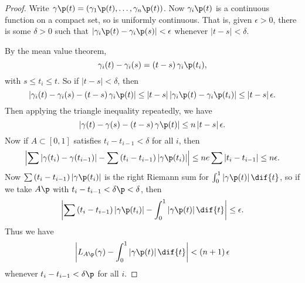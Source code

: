 \begin{proof}
	Write $\gamma\p(t) = (\gamma_1\p(t), \ldots, \gamma_n\p(t))$. Now $\gamma_i\p(t)$ is a continuous function on a compact set, so is uniformly continuous. That is, given $\epsilon>0$, there is some $\delta>0$ such that $\left\vert \gamma_i\p(t) - \gamma_i\p(s) \right\vert < \epsilon$ whenever $\left\vert t-s \right\vert<\delta$. %
	
	By the mean value theorem,
	\begin{equation*}
		\gamma_i(t) - \gamma_i(s) = \left( t-s \right) \gamma_i\p(t_i),
	\end{equation*}
	with $s\leq t_i \leq t$.  So if $\left\vert t-s \right\vert<\delta$, then
	\begin{equation*}
		\left\vert \gamma_i(t) - \gamma_i(s) - \left( t-s \right) \gamma_i\p(t) \right\vert \leq \left\vert t-s \right\vert \left\vert \gamma_i\p(t) - \gamma_i\p(t_i) \right\vert \leq \left\vert t-s \right\vert \epsilon. %
	\end{equation*}
	Then applying the triangle inequality repeatedly, we have
	\begin{equation*}
		\left\vert \gamma(t) - \gamma(s) - \left( t-s \right) \gamma\p(t) \right\vert \leq n\left\vert t-s \right\vert \epsilon. %
	\end{equation*}
	Now if $A\subset [0,1]$ satisfies $t_i - t_{i-1}<\delta$ for all $i$, then
	\begin{equation*}
		\left\vert \sum \left\vert \gamma(t_i) - \gamma(t_{i-1}) \right\vert - \sum \left( t_i-t_{i-1} \right) \left\vert \gamma\p(t_i) \right\vert \right\vert \leq ne \sum \left\vert t_i - t_{i-1} \right\vert \leq n \epsilon. %
	\end{equation*}
	Now $\sum \left( t_i-t_{i-1} \right) \left\vert \gamma\p(t_i) \right\vert$ is the right Riemann sum for $\int_0^1 \left\vert \gamma\p(t) \right\vert \dif{t}$, so if we take $A\p$ with $t_i-t_{i-1} < \delta\p < \delta$, then %
	\begin{equation*}
		\left\vert \sum \left( t_i-t_{i-1} \right) \left\vert \gamma\p(t_i) \right\vert - \int_0^1 \left\vert \gamma\p(t) \right\vert \dif{t} \right\vert \leq \epsilon. %
	\end{equation*}
	Thus we have
	\begin{equation*}
		\left\vert L_{A\p}(\gamma) - \int_0^1 \left\vert \gamma\p(t) \right\vert \dif{t} \right\vert < \left( n+1 \right) \epsilon %
	\end{equation*}
	whenever $t_i-t_{i-1} < \delta\p$ for all $i$.
	

\end{proof}
